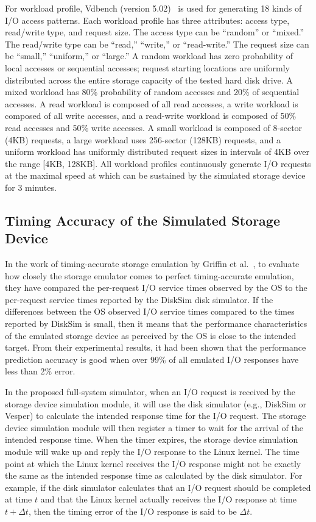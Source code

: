 For workload profile, Vdbench (version 5.02)~\cite{Vdbench:2013} is used for generating 18 kinds of I/O access patterns. Each workload profile has three attributes: access type, read/write type, and request size. The access type can be ``random'' or ``mixed.'' The read/write type can be ``read,'' ``write,'' or ``read-write.'' The request size can be ``small,'' ``uniform,'' or ``large.'' A random workload has zero probability of local accesses or sequential accesses; request starting locations are uniformly distributed across the entire storage capacity of the tested hard disk drive. A mixed workload has 80\% probability of random accesses and 20\% of sequential accesses. A read workload is composed of all read accesses, a write workload is composed of all write accesses, and a read-write workload is composed of 50\% read accesses and 50\% write accesses. A small workload is composed of 8-sector (4KB) requests, a large workload uses 256-sector (128KB) requests, and a uniform workload has uniformly distributed request sizes in intervals of 4KB over the range [4KB, 128KB]. All workload profiles continuously generate I/O requests at the maximal speed at which can be sustained by the simulated storage device for 3 minutes.

\subsection{Timing Accuracy of the Simulated Storage Device}

In the work of timing-accurate storage emulation by Griffin et al.~\cite{Griffin:2002}, to evaluate how closely the storage emulator comes to perfect timing-accurate emulation, they have compared the per-request I/O service times observed by the OS to the per-request service times reported by the DiskSim disk simulator. If the differences between the OS observed I/O service times compared to the times reported by DiskSim is small, then it means that the performance characteristics of the emulated storage device as perceived by the OS is close to the intended target. From their experimental results, it had been shown that the performance prediction accuracy is good when over 99\% of all emulated I/O responses have less than 2\% error. 

In the proposed full-system simulator, when an I/O request is received by the storage device simulation module, it will use the disk simulator (e.g., DiskSim or Vesper) to calculate the intended response time for the I/O request. The storage device simulation module will then register a timer to wait for the arrival of the intended response time. When the timer expires, the storage device simulation module will wake up and reply the I/O response to the Linux kernel. The time point at which the Linux kernel receives the I/O response might not be exactly the same as the intended response time as calculated by the disk simulator. For example, if the disk simulator calculates that an I/O request should be completed at time $t$ and that the Linux kernel actually receives the I/O response at time $t + \Delta t$, then the timing error of the I/O response is said to be $\Delta t$.


